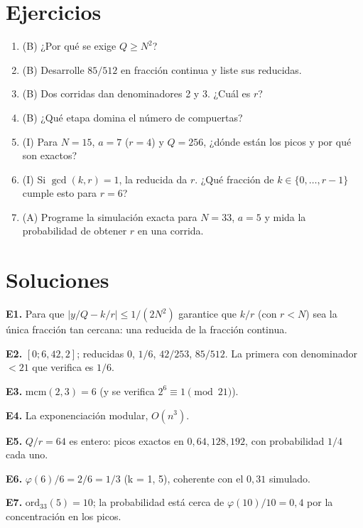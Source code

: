 \documentclass[11pt,a4paper]{article}
\begin{document}
\section{Ejercicios}
\begin{enumerate}[label=\textbf{E\arabic*.}]
\item (B) ¿Por qué se exige $Q\ge N^2$?
\item (B) Desarrolle $85/512$ en fracción continua y liste sus reducidas.
\item (B) Dos corridas dan denominadores 2 y 3. ¿Cuál es $r$?
\item (B) ¿Qué etapa domina el número de compuertas?
\item (I) Para $N=15$, $a=7$ ($r=4$) y $Q=256$, ¿dónde están los picos y por qué son exactos?
\item (I) Si $\gcd(k,r)=1$, la reducida da $r$. ¿Qué fracción de $k\in\{0,\dots,r-1\}$ cumple esto para $r=6$?
\item (A) Programe la simulación exacta para $N=33$, $a=5$ y mida la probabilidad de obtener $r$ en una corrida.
\end{enumerate}
\section{Soluciones}
\begin{solucion}
\textbf{E1.} Para que $|y/Q-k/r|\le1/(2N^2)$ garantice que $k/r$ (con $r<N$) sea la única fracción tan cercana: una reducida de la fracción continua.

\textbf{E2.} $[0;6,42,2]$; reducidas $0$, $1/6$, $42/253$, $85/512$. La primera con denominador $<21$ que verifica es $1/6$.

\textbf{E3.} $\mathrm{mcm}(2,3)=6$ (y se verifica $2^6\equiv1\pmod{21}$).

\textbf{E4.} La exponenciación modular, $O(n^3)$.

\textbf{E5.} $Q/r=64$ es entero: picos exactos en $0,64,128,192$, con probabilidad $1/4$ cada uno.

\textbf{E6.} $\varphi(6)/6=2/6=1/3$ (k = 1, 5), coherente con el $0{,}31$ simulado.

\textbf{E7.} $\mathrm{ord}_{33}(5)=10$; la probabilidad está cerca de $\varphi(10)/10=0{,}4$ por la concentración en los picos.
\end{solucion}
\end{document}
